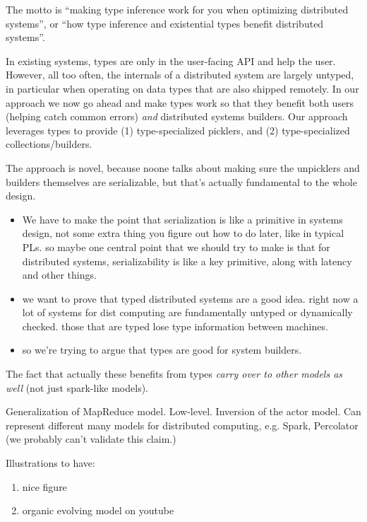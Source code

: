 \documentclass[preprint]{sigplanconf}
\theoremstyle{definition}
\theoremstyle{definition}
\begin{document}
The motto is ``making type inference work for you when optimizing distributed
systems'', or ``how type inference and existential types benefit distributed
systems''.

In existing systems, types are only in the user-facing API and help the user.
However, all too often, the internals of a distributed system are largely
untyped, in particular when operating on data types that are also shipped
remotely. In our approach we now go ahead and make types work so that they
benefit both users (helping catch common errors) \emph{and} distributed
systems builders. Our approach leverages types to provide (1) type-specialized
picklers, and (2) type-specialized collections/builders.

The approach is novel, because noone talks about making sure the unpicklers
and builders themselves are serializable, but that's actually fundamental to
the whole design.

\begin{itemize}

\item We have to make the point that serialization is like a primitive in
systems design, not some extra thing you figure out how to do later, like in
typical PLs. so maybe one central point that we should try to make is that
for distributed systems, serializability is like a key primitive, along with
latency and other things.

\item we want to prove that typed distributed systems are a good idea. right
now a lot of systems for dist computing are fundamentally untyped or
dynamically checked. those that are typed lose type information between
machines.

\item so we're trying to argue that types are good for system builders.

\end{itemize}

The fact that actually these benefits from types \emph{carry over to other
models as well} (not just spark-like models).


Generalization of MapReduce model. Low-level. Inversion of the actor model.
Can represent different many models for distributed computing, e.g. Spark,
Percolator (we probably can't validate this claim.)

Illustrations to have:
\begin{enumerate}
\item nice figure
\item organic evolving model on youtube
\end{enumerate}
\end{document}
